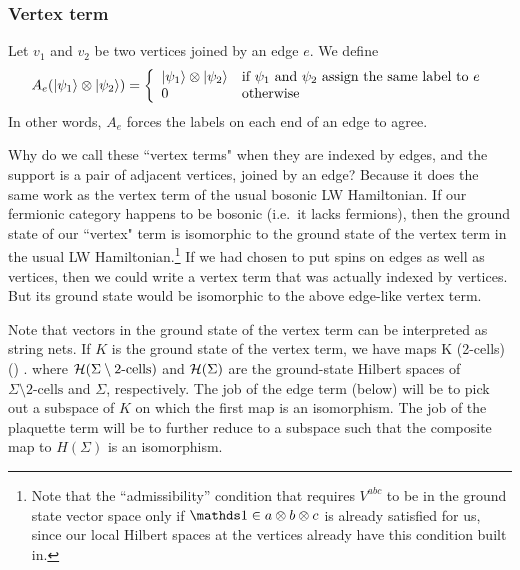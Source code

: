\subsubsection{Vertex term}   \label{VertexHamiltonian}

Let $v_1$ and $v_2$ be two vertices joined by an edge $e$.
We define
\begin{align}
A_e(\left|\psi_1\right\rangle \otimes \left|\psi_2\right\rangle) = 
\left\{
                \begin{array}{ll}
                   \left|\psi_1\right\rangle \otimes \left|\psi_2\right\rangle & \text{if $\psi_1$ and $\psi_2$ assign the same label to $e$} \\
                  0 & \text{otherwise}
                \end{array}
              \right.
\end{align}
In other words, $A_e$ forces the labels on each end of an edge to agree.

Why do we call these ``vertex terms" when they are indexed by edges, and the support is a pair of adjacent vertices, joined by an edge?
Because it does the same work as the vertex term of the usual bosonic LW Hamiltonian.
If our fermionic category happens to be bosonic (i.e.\ it lacks fermions), then the ground state of our ``vertex" term is isomorphic to the ground state
of the vertex term in the usual LW Hamiltonian.\footnote{Note that the ``admissibility'' condition that requires $V^{abc}$ to be in the ground state vector space only if $\unit\in a\tp b \tp c$ is already satisfied for us, since our local Hilbert spaces at the vertices already have this condition built in.}
If we had chosen to put spins on edges as well as vertices, then we could write a vertex term that was actually indexed by vertices.
But its ground state would be isomorphic to the above edge-like vertex term.

Note that vectors in the ground state of the vertex term can be interpreted as string nets.
If $K$ is the ground state of the vertex term, we have maps
\be
	K \to \mch(\Sigma \setminus \mbox{2-cells}) \to \mch(\Sigma) .
	\label{ground_state_projection}
\ee
where $\mathcal{H}(\Sigma \setminus \mbox{2-cells})$ and $\mathcal{H}(\Sigma)$ are the ground-state Hilbert spaces of $\Sigma \setminus \mbox{2-cells}$ and $\Sigma$, respectively.
The job of the edge term (below) will be to pick out a subspace of $K$ on which the first map is an isomorphism. 
The job of the plaquette term will be to further reduce to a subspace such that the composite map to $H(\Sigma)$ is an isomorphism.




